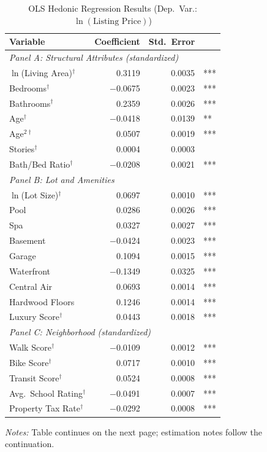 \begin{table}[H]
\centering
\caption{OLS Hedonic Regression Results (Dep.\ Var.: $\ln(\text{Listing Price})$)}
\label{tab:ols_results}
\begin{threeparttable}
\footnotesize
\renewcommand{\arraystretch}{0.92}
\begin{tabular}{lrrl}
\toprule
Variable & Coefficient & Std.\ Error & \\
\midrule
\multicolumn{4}{l}{\textit{Panel A: Structural Attributes (standardized)}} \\
$\ln$(Living Area)$^\dagger$ & 0.3119 & 0.0035 & *** \\
Bedrooms$^\dagger$ & $-$0.0675 & 0.0023 & *** \\
Bathrooms$^\dagger$ & 0.2359 & 0.0026 & *** \\
Age$^\dagger$ & $-$0.0418 & 0.0139 & ** \\
Age$^{2\dagger}$ & 0.0507 & 0.0019 & *** \\
Stories$^\dagger$ & 0.0004 & 0.0003 & \\
Bath/Bed Ratio$^\dagger$ & $-$0.0208 & 0.0021 & *** \\
\midrule
\multicolumn{4}{l}{\textit{Panel B: Lot and Amenities}} \\
$\ln$(Lot Size)$^\dagger$ & 0.0697 & 0.0010 & *** \\
Pool & 0.0286 & 0.0026 & *** \\
Spa & 0.0327 & 0.0027 & *** \\
Basement & $-$0.0424 & 0.0023 & *** \\
Garage & 0.1094 & 0.0015 & *** \\
Waterfront & $-$0.1349 & 0.0325 & *** \\
Central Air & 0.0693 & 0.0014 & *** \\
Hardwood Floors & 0.1246 & 0.0014 & *** \\
Luxury Score$^\dagger$ & 0.0443 & 0.0018 & *** \\
\midrule
\multicolumn{4}{l}{\textit{Panel C: Neighborhood (standardized)}} \\
Walk Score$^\dagger$ & $-$0.0109 & 0.0012 & *** \\
Bike Score$^\dagger$ & 0.0717 & 0.0010 & *** \\
Transit Score$^\dagger$ & 0.0524 & 0.0008 & *** \\
Avg.\ School Rating$^\dagger$ & $-$0.0491 & 0.0007 & *** \\
Property Tax Rate$^\dagger$ & $-$0.0292 & 0.0008 & *** \\
\bottomrule
\end{tabular}
\begin{tablenotes}
\small
\item \textit{Notes:} Table continues on the next page; estimation notes follow the continuation.
\end{tablenotes}
\end{threeparttable}
\end{table}

